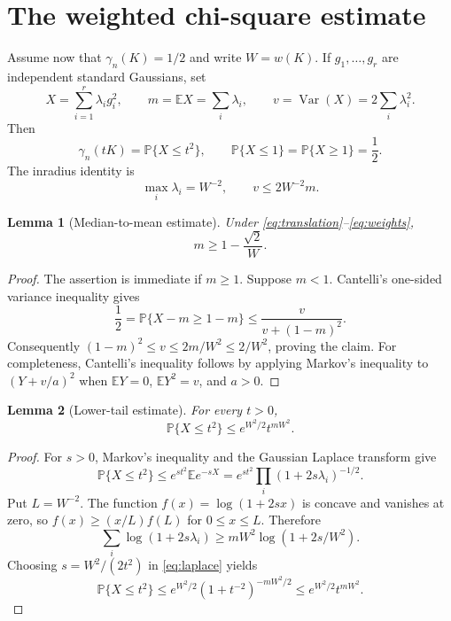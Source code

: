 \documentclass[11pt]{article}
\newtheorem{lemma}{Lemma}
\begin{document}
\section{The weighted chi-square estimate}

Assume now that $\gamma_n(K)=1/2$ and write $W=w(K)$.  If
$g_1,\dots,g_r$ are independent standard Gaussians, set
\[
 X=\sum_{i=1}^r\lambda_i g_i^2,\qquad
 m=\mathbb EX=\sum_i\lambda_i,\qquad
 v=\operatorname{Var}(X)=2\sum_i\lambda_i^2.
\]
Then
\begin{equation}\label{eq:translation}
 \gamma_n(tK)=\mathbb P\{X\le t^2\},\qquad
 \mathbb P\{X\le1\}=\mathbb P\{X\ge1\}=\frac12.
\end{equation}
The inradius identity is
\begin{equation}\label{eq:weights}
 \max_i\lambda_i=W^{-2},\qquad
 v\le2W^{-2}m.
\end{equation}

\begin{lemma}[Median-to-mean estimate]\label{lem:mass}
Under \eqref{eq:translation}--\eqref{eq:weights},
\[
 m\ge1-\frac{\sqrt2}{W}.
\]
\end{lemma}

\begin{proof}
The assertion is immediate if $m\ge1$.  Suppose $m<1$.  Cantelli's
one-sided variance inequality gives
\[
 \frac12=\mathbb P\{X-m\ge1-m\}
 \le\frac{v}{v+(1-m)^2}.
\]
Consequently $(1-m)^2\le v\le2m/W^2\le2/W^2$, proving the claim.
For completeness, Cantelli's inequality follows by applying Markov's
inequality to $(Y+v/a)^2$ when $\mathbb EY=0$,
$\mathbb EY^2=v$, and $a>0$.
\end{proof}

\begin{lemma}[Lower-tail estimate]\label{lem:tail}
For every $t>0$,
\begin{equation}\label{eq:tail}
 \mathbb P\{X\le t^2\}
 \le e^{W^2/2}t^{mW^2}.
\end{equation}
\end{lemma}

\begin{proof}
For $s>0$, Markov's inequality and the Gaussian Laplace transform give
\begin{equation}\label{eq:laplace}
 \mathbb P\{X\le t^2\}
 \le e^{st^2}\mathbb Ee^{-sX}
 =e^{st^2}\prod_i(1+2s\lambda_i)^{-1/2}.
\end{equation}
Put $L=W^{-2}$.  The function
$f(x)=\log(1+2sx)$ is concave and vanishes at zero, so
$f(x)\ge(x/L)f(L)$ for $0\le x\le L$.  Therefore
\[
 \sum_i\log(1+2s\lambda_i)
 \ge mW^2\log(1+2s/W^2).
\]
Choosing $s=W^2/(2t^2)$ in \eqref{eq:laplace} yields
\[
 \mathbb P\{X\le t^2\}
 \le e^{W^2/2}(1+t^{-2})^{-mW^2/2}
 \le e^{W^2/2}t^{mW^2}.
\]
\end{proof}
\end{document}
